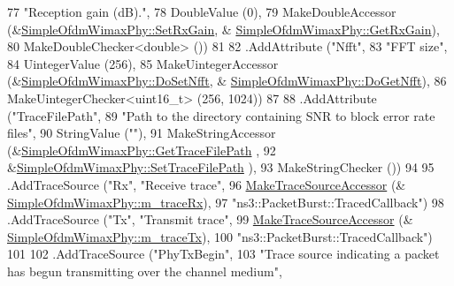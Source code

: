 \begin{DoxyCode}
77                    \textcolor{stringliteral}{"Reception gain (dB)."},
78                    DoubleValue (0),
79                    MakeDoubleAccessor (&\hyperlink{classns3_1_1SimpleOfdmWimaxPhy_a4707f9c2c7d2729f80db05db589efc81}{SimpleOfdmWimaxPhy::SetRxGain}, &
      \hyperlink{classns3_1_1SimpleOfdmWimaxPhy_ad9e3c277c963dbee2340fc90f36b1a07}{SimpleOfdmWimaxPhy::GetRxGain}),
80                    MakeDoubleChecker<double> ())
81 
82     .AddAttribute (\textcolor{stringliteral}{"Nfft"},
83                    \textcolor{stringliteral}{"FFT size"},
84                    UintegerValue (256),
85                    MakeUintegerAccessor (&\hyperlink{classns3_1_1SimpleOfdmWimaxPhy_a51906271c767f4880fe489b6567603b5}{SimpleOfdmWimaxPhy::DoSetNfft}, &
      \hyperlink{classns3_1_1SimpleOfdmWimaxPhy_afbd37bfeff3d01d21c67965cb645e152}{SimpleOfdmWimaxPhy::DoGetNfft}),
86                    MakeUintegerChecker<uint16\_t> (256, 1024))
87 
88     .AddAttribute (\textcolor{stringliteral}{"TraceFilePath"},
89                    \textcolor{stringliteral}{"Path to the directory containing SNR to block error rate files"},
90                    StringValue (\textcolor{stringliteral}{""}),
91                    MakeStringAccessor (&\hyperlink{classns3_1_1SimpleOfdmWimaxPhy_afe47a07b934f698b5606c4f14b0219bf}{SimpleOfdmWimaxPhy::GetTraceFilePath}
      ,
92                                        &\hyperlink{classns3_1_1SimpleOfdmWimaxPhy_a3f90e6261b5238201701a7275300b008}{SimpleOfdmWimaxPhy::SetTraceFilePath}
      ),
93                    MakeStringChecker ())
94 
95     .AddTraceSource (\textcolor{stringliteral}{"Rx"}, \textcolor{stringliteral}{"Receive trace"},
96                      \hyperlink{group__tracing_gab21a770b9855af4e8f69f7531ea4a6b0}{MakeTraceSourceAccessor} (&
      \hyperlink{classns3_1_1SimpleOfdmWimaxPhy_af98beb50419576fec304794528811af7}{SimpleOfdmWimaxPhy::m\_traceRx}),
97                      \textcolor{stringliteral}{"ns3::PacketBurst::TracedCallback"})
98     .AddTraceSource (\textcolor{stringliteral}{"Tx"}, \textcolor{stringliteral}{"Transmit trace"},
99                      \hyperlink{group__tracing_gab21a770b9855af4e8f69f7531ea4a6b0}{MakeTraceSourceAccessor} (&
      \hyperlink{classns3_1_1SimpleOfdmWimaxPhy_a85b3dfc29714e193dafe64349fb855d7}{SimpleOfdmWimaxPhy::m\_traceTx}),
100                      \textcolor{stringliteral}{"ns3::PacketBurst::TracedCallback"})
101 
102     .AddTraceSource (\textcolor{stringliteral}{"PhyTxBegin"},
103                      \textcolor{stringliteral}{"Trace source indicating a packet has begun transmitting over the channel medium"},

\end{DoxyCode}
